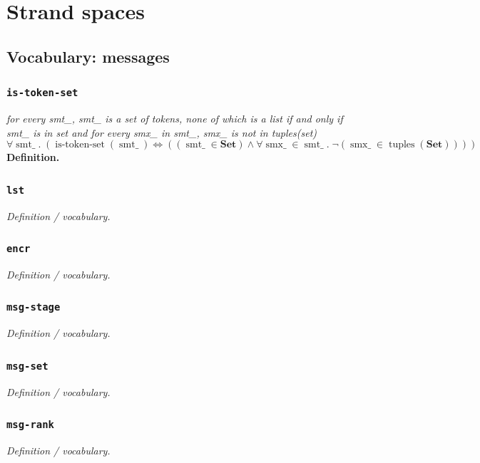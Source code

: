 \documentclass[11pt]{article}
\begin{document}
\section{Strand spaces}

\subsection{Vocabulary: messages}

\subsubsection*{\texttt{is-token-set}}
\emph{for every smt\_, smt\_ is a set of tokens, none of which is a list if and only if smt\_ is in set and for every smx\_ in smt\_, smx\_ is not in tuples(set)}
{\small\[
\forall \operatorname{smt\_}.\; (\operatorname{is\text{-}token\text{-}set}(\operatorname{smt\_}) \Leftrightarrow ((\operatorname{smt\_} \in \mathbf{Set}) \wedge \forall \operatorname{smx\_} \in \operatorname{smt\_}.\; \neg (\operatorname{smx\_} \in \operatorname{tuples}(\mathbf{Set}))))
\]}
\noindent\textbf{Definition.}

\subsubsection*{\texttt{lst}}
\emph{Definition / vocabulary.}

\subsubsection*{\texttt{encr}}
\emph{Definition / vocabulary.}

\subsubsection*{\texttt{msg-stage}}
\emph{Definition / vocabulary.}

\subsubsection*{\texttt{msg-set}}
\emph{Definition / vocabulary.}

\subsubsection*{\texttt{msg-rank}}
\emph{Definition / vocabulary.}
\end{document}

